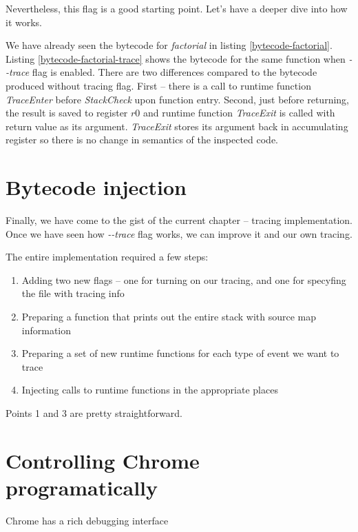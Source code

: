 

Nevertheless, this flag is a good starting point. Let's have a deeper dive into how it works.

We have already seen the bytecode for \emph{factorial} in listing \ref{bytecode-factorial}.
Listing \ref{bytecode-factorial-trace} shows the bytecode for the same function when \emph{-{}-trace}
flag is enabled. There are two differences compared to the bytecode produced without tracing flag.
First -- there is a call to runtime function \emph{TraceEnter} before \emph{StackCheck} upon function entry. 
Second, just before returning, the result is saved to register $r0$ and runtime function \emph{TraceExit} is called
with return value as its argument. \emph{TraceExit} stores its argument back in accumulating register so there
is no change in semantics of the inspected code.




\section{Bytecode injection}
\label{v8-bytecode-injection}

Finally, we have come to the gist of the current chapter -- tracing implementation.
Once we have seen how \emph{-{}-trace} flag works, we can improve it and our own tracing.

The entire implementation required a few steps:
\begin{enumerate}
  \item Adding two new flags -- one for turning on our tracing, and one for specyfing the file with tracing info
  \item Preparing a function that prints out the entire stack with source map information
  \item Preparing a set of new runtime functions for each type of event we want to trace
  \item Injecting calls to runtime functions in the appropriate places
\end{enumerate}

Points 1 and 3 are pretty straightforward.



\section{Controlling Chrome programatically}
Chrome has a rich debugging interface


